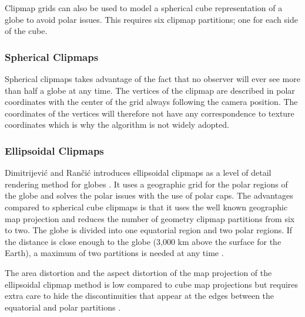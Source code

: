 Clipmap grids can also be used to model a spherical cube representation of a globe to avoid polar issues. This requires six clipmap partitions; one for each side of the cube.

\subsubsection{Spherical Clipmaps}
Spherical clipmaps takes advantage of the fact that no observer will ever see more than half a globe at any time. The vertices of the clipmap are described in polar coordinates with the center of the grid always following the camera position. The coordinates of the vertices will therefore not have any correspondence to texture coordinates which is why the algorithm is not widely adopted\cite{dimi15}. 

\subsubsection{Ellipsoidal Clipmaps}
Dimitrijevi\'{c} and Ran\v{c}i\'{c} introduces ellipsoidal clipmaps as a level of detail rendering method for globes \cite{dimi15}. It uses a geographic grid for the polar regions of the globe and solves the polar issues with the use of polar caps. The advantages compared to spherical cube clipmaps is that it uses the well known geographic map projection and reduces the number of geometry clipmap partitions from six to two. The globe is divided into one equatorial region and two polar regions. If the distance is close enough to the globe (3,000 km above the surface for the Earth), a maximum of two partitions is needed at any time \cite{dimi15}.

The area distortion and the aspect distortion of the map projection of the ellipsoidal clipmap method is low compared to cube map projections but requires extra care to hide the discontinuities that appear at the edges between the equatorial and polar partitions \cite{dimi15}.

